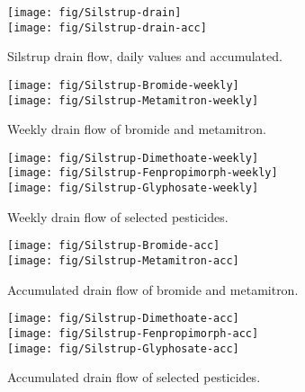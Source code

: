 \begin{figure}[htbp]
  \begin{center}
    \texttt{[image: fig/Silstrup-drain]}\\
    \texttt{[image: fig/Silstrup-drain-acc]}
  \end{center}
  \caption{Silstrup drain flow, daily values and accumulated.}
  \label{fig:Silstrup-drain}
\end{figure}\FloatBarrier

\begin{figure}[htbp]
  \begin{center}
    \texttt{[image: fig/Silstrup-Bromide-weekly]}\\
    \texttt{[image: fig/Silstrup-Metamitron-weekly]}
  \end{center}
  \caption{Weekly drain flow of bromide and metamitron.}
  \label{fig:Silstrup-weekly}
\end{figure}\FloatBarrier

\begin{figure}[htbp]
  \begin{center}
    \texttt{[image: fig/Silstrup-Dimethoate-weekly]}\\
    \texttt{[image: fig/Silstrup-Fenpropimorph-weekly]}\\
    \texttt{[image: fig/Silstrup-Glyphosate-weekly]}
  \end{center}
  \caption{Weekly drain flow of selected pesticides.}
  \label{fig:Silstrup-weekly2}
\end{figure}\FloatBarrier

\begin{figure}[htbp]
  \begin{center}
    \texttt{[image: fig/Silstrup-Bromide-acc]}\\
    \texttt{[image: fig/Silstrup-Metamitron-acc]}
  \end{center}
  \caption{Accumulated drain flow of bromide and metamitron.}
  \label{fig:Silstrup-bromide-acc}
\end{figure}\FloatBarrier

\begin{figure}[htbp]
  \begin{center}
    \texttt{[image: fig/Silstrup-Dimethoate-acc]}\\
    \texttt{[image: fig/Silstrup-Fenpropimorph-acc]}\\
    \texttt{[image: fig/Silstrup-Glyphosate-acc]}
  \end{center}
  \caption{Accumulated drain flow of selected pesticides.}
  \label{fig:Silstrup-acc}
\end{figure}\FloatBarrier

